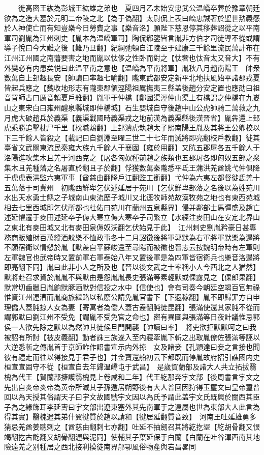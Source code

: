 　　徙高密王紘為彭城王紘雄之弟也　夏四月乙未始安忠武公温嶠卒葬於豫章朝廷欲為之造大墓於元明二帝陵之北【為于偽翻】太尉侃上表曰嶠忠誠著於聖世勲義感於人神使亡而有知豈樂今日勞費之事【樂音洛】願陛下慈恩停其移葬詔從之以平南軍司劉胤為江州刺史【胤本為温嶠軍司】陶侃郗鑒皆言胤非方伯才司徒導不從或謂導子悅曰今大難之後【難乃旦翻】紀綱弛頓自江陵至于建康三千餘里流民萬計布在江州江州國之南藩要害之地而胤以忲侈之性卧而對之【忲奢也忲音太又音大】不有外變必有内患矣悦曰此温平南之意也【温嶠為平南將軍】胤秋八月趙南陽王　帥衆數萬自上邽趣長安【帥讀曰率趣七喻翻】隴東武都安定新平北地扶風始平諸郡戎夏皆起兵應之【魏收地形志有隴東郡領涇陽祖厲撫夷三縣盖後趙分安定置也應劭曰祖音罝師古曰厲音賴夏戶雅翻】胤軍于仲橋【鄭國渠涇仲山渠上有橋謂之仲橋在九嵏山之東宋白曰雍州醴泉縣城即仲橋城】石生嬰城自守後趙中山公虎帥騎二萬救之九月虎大破趙兵於義渠【義渠戰國時義渠戎之地前漢為義渠縣後漢晉省】胤犇還上邽虎乘勝追擊枕尸千里【枕職鴆翻】上邽潰虎執趙太子熙南陽王胤及其將王公卿校以下三千餘人皆殺之【載記曰自劉淵至曜三世二十七年而滅將即亮翻校戶教翻】徙其臺省文武關東流民秦雍大族九千餘人于襄國【雍於用翻】又阬五郡屠各五千餘人于洛陽進攻集木且羌于河西克之【屠各匈奴種前趙之族類也五郡屠各即匈奴五部之衆集木且羌種落之名屠直於翻且子於翻】俘獲數萬秦隴悉平氐王蒲洪羌酋姚弋仲俱降于虎虎表洪監六夷軍事【酋慈由翻降戶江翻監工銜翻】弋仲為六夷左都督徙氐羌十五萬落于司冀州　初隴西鮮卑乞伏述延居于苑川【乞伏鮮卑部落之名後以為姓苑川水出天水勇士縣之子城南山東流歷子城川又北逕牧師苑故漢牧苑之地也有東西苑城相去七里西城即乞伏所都也杜佑曰苑川在蘭州五泉縣界】侵并鄰部士馬彊盛及趙亡述延懼遷于麥田述延卒子傉大寒立傉大寒卒子司繁立【水經注麥田山在安定北界山之東北有麥田城又北有麥田泉傉奴沃翻乞伏始見于此】　江州刺史劉胤矜豪日甚專務商販殖財百萬縱酒躭樂不恤政事冬十二月詔徵後將軍郭默為右軍將軍默樂為邊將不願宿衛以情愬於胤【默盖自平蘇峻還至尋陽而被徵也晉志云按魏明帝時有左軍則左軍魏官也武帝時又置前軍右軍泰始八年又置後軍是為四軍皆宿衛兵也樂音洛邊將即亮翻下同】胤曰此非小人之所及也【晉以後文武之士率稱小人今西北之人猶然】默將赴召求資於胤胤不與默由是怨胤胤長史張滿等素輕默或倮露見之【倮郎果翻】默常切齒臘日胤餉默豚酒默對信投之水中【信使也】會有司奏今朝廷空竭百官無祿惟資江州運漕而胤商旅繼路以私廢公請免胤官書下【下遐稼翻】胤不即歸罪方自申理僑人蓋肫掠人女為妻【寄寓者為僑人蓋古盍翻肫徒昆翻】張滿使還其家肫不從而謂郭默曰劉江州不受免【謂胤不受免官之命也】密有異圖與張滿等日夜計議惟忌郭侯一人欲先除之默以為然帥其徒候旦門開襲【帥讀曰率】　將吏欲拒默默呵之曰我被詔有所討【被皮義翻】動者誅三族遂入至内寢牽胤下斬之出取胤僚佐張滿等誣以大逆悉斬之傳胤首于京師詐作詔書宣示内外掠　女及諸妾【孔穎達曰妾之言接也聞彼有禮走而往以得接見于君子也】并金寶還船初云下都既而停胤故府招引譙國内史桓宣宣固守不從【桓宣自去年歸温嶠屯于武昌】　是歲賀蘭部及諸大人共立拓拔翳槐為代王【賀蘭部擁護翳槐見上卷咸和二年】代王紇那奔宇文部【後周書言宇文之先出自炎帝炎帝為黄帝所滅其子孫遁居朔野後有大人普回因狩得玉璽文曰皇帝璽普回以為天授其俗謂天子曰宇文故國號宇文因以為氏予謂此盖宇文氏既興於關西其臣子為之緣飾耳李延夀曰宇文部出遼東塞外其先南軍于之遠屬也世為東部大人此言為得其實】翳槐遣其弟什翼犍質於趙以請和【犍居延翻質音致】　河南王吐延雄勇多猜忌羌酋姜聰刺之【酋慈由翻刺七亦翻】吐延不抽劒召其將紇扢埿【紇胡骨翻又恨竭翻扢古齕翻又胡骨翻渥與泥同】使輔其子葉延保于白蘭【白蘭在吐谷渾西南其地險遠羌之别種居之西北接利摸徒南界郍卾風俗物產與宕昌畧同